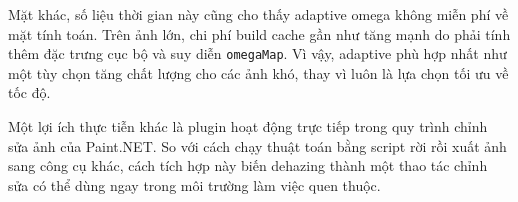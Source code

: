 Mặt khác, số liệu thời gian này cũng cho thấy adaptive omega không miễn phí về mặt tính toán. Trên ảnh lớn, chi phí build cache gần như tăng mạnh do phải tính thêm đặc trưng cục bộ và suy diễn \texttt{omegaMap}. Vì vậy, adaptive phù hợp nhất như một tùy chọn tăng chất lượng cho các ảnh khó, thay vì luôn là lựa chọn tối ưu về tốc độ.

Một lợi ích thực tiễn khác là plugin hoạt động trực tiếp trong quy trình chỉnh sửa ảnh của Paint.NET. So với cách chạy thuật toán bằng script rời rồi xuất ảnh sang công cụ khác, cách tích hợp này biến dehazing thành một thao tác chỉnh sửa có thể dùng ngay trong môi trường làm việc quen thuộc.
